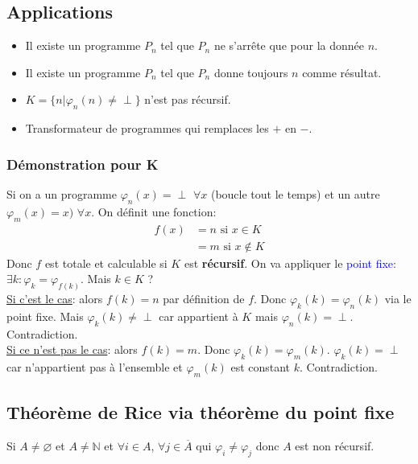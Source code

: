 \documentclass{report}
\begin{document}
\subsection{Applications}
\begin{itemize}
\item Il existe un programme $P_n$ tel que $P_n$ ne s'arrête que pour la donnée $n$.
\item Il existe un programme $P_n$ tel que $P_n$ donne toujours $n$ comme résultat.
\item $K = \{n | \varphi_n (n) \neq \perp \}$ n'est pas récursif.
\item Transformateur de programmes qui remplaces les $+$ en $-$.
\end{itemize}

\subsubsection{Démonstration pour K}
Si on a un programme $\varphi_n (x) = \perp$ $\forall x$ (boucle tout le temps) et un autre $\varphi_m (x) = x)$ $ \forall x$. On définit une fonction:
\begin{align*}
f(x) &= n \text{ si } x \in K\\
&= m \text{ si } x \notin K
\end{align*}
Donc $f$ est totale et calculable si $K$ est \textbf{récursif}. On va appliquer le \textcolor{blue}{point fixe}: $\exists k: \varphi_k = \varphi_{f(k)}$. Mais $k \in K$ ?\\
\underline{Si c'est le cas}: alors $f(k) = n$ par définition de $f$. Donc $\varphi_k (k) = \varphi_n (k)$ via le point fixe. Mais $\varphi_k (k) \neq \perp$ car appartient à $K$ mais $\varphi_n (k) = \perp$. Contradiction.\\ 
\underline{Si ce n'est pas le cas}: alors $f(k) = m$. Donc $\varphi_k (k) = \varphi_m (k)$. $\varphi_k (k) = \perp$ car n'appartient pas à l'ensemble et $\varphi_m (k)$ est constant $k$. Contradiction.

\subsection{Théorème de Rice via théorème du point fixe}
Si $A \neq \varnothing$ et $A \neq \mathbb{N}$ et $\forall i \in A$, $\forall j \in \overline{A}$ qui $\varphi_i \neq \varphi_j$ donc $A$ est non récursif.
\end{document}
